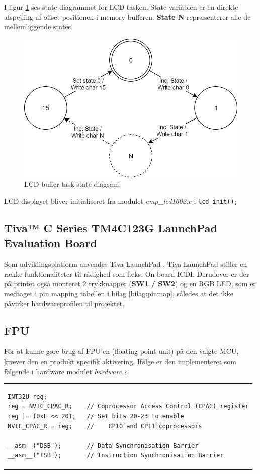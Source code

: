 I figur \ref{fig:lcd_task} ses state diagrammet for LCD tasken. State variablen er en direkte afspejling af offset positionen i memory bufferen. \textbf{State N} repræsenterer alle de mellemliggende states.

\begin{figure}[h!]
	\centering
	\includegraphics[width=.6\textwidth]{billeder/lcd_task.png}
	\caption{LCD buffer task state diagram.}
	\label{fig:lcd_task}
\end{figure}

LCD displayet bliver initialiseret fra modulet \textit{emp\_lcd1602.c} i  \texttt{lcd\_init();}
  
\FloatBlock

\subsection{Tiva™ C Series TM4C123G LaunchPad Evaluation Board}
Som udviklingsplatform anvendes Tiva LaunchPad \cite{spmu296}. 
Tiva LaunchPad stiller en række funktionaliteter til rådighed som f.eks. On-board ICDI.
Derudover er der på printet også monteret 2 trykknapper (\textbf{SW1 / SW2}) og en RGB LED, som er medtaget i pin mapping tabellen i bilag \ref{bilag:pinmap}, således at det ikke påvirker hardwareprofilen til projektet.   

\subsection{FPU}
For at kunne gøre brug af FPU'en (floating point unit) på den valgte MCU, kræver den en produkt specifik aktivering.
Ifølge \cite[afsnit 3.1.5.7 s. 132]{tm4c123gh6pm} er den implementeret som følgende i hardware modulet \textit{hardware.c}.

\begin{tabular}{l}
\begin{lstlisting}[title=init\_FPU()]
INT32U reg;
reg = NVIC_CPAC_R;    // Coprocessor Access Control (CPAC) register
reg |= (0xF << 20);   // Set bits 20-23 to enable 
NVIC_CPAC_R = reg;    // 	CP10 and CP11 coprocessors

__asm__("DSB");       // Data Synchronisation Barrier
__asm__("ISB");       // Instruction Synchronisation Barrier
\end{lstlisting}
\end{tabular}


 